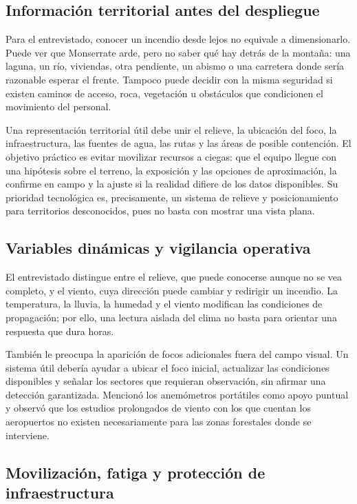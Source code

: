 \subsection{Información territorial antes del despliegue}

Para el entrevistado, conocer un incendio desde lejos no equivale a dimensionarlo. Puede ver que Monserrate arde, pero no saber qué hay detrás de la montaña: una laguna, un río, viviendas, otra pendiente, un abismo o una carretera donde sería razonable esperar el frente. Tampoco puede decidir con la misma seguridad si existen caminos de acceso, roca, vegetación u obstáculos que condicionen el movimiento del personal.

Una representación territorial útil debe unir el relieve, la ubicación del foco, la infraestructura, las fuentes de agua, las rutas y las áreas de posible contención. El objetivo práctico es evitar movilizar recursos a ciegas: que el equipo llegue con una hipótesis sobre el terreno, la exposición y las opciones de aproximación, la confirme en campo y la ajuste si la realidad difiere de los datos disponibles. Su prioridad tecnológica es, precisamente, un sistema de relieve y posicionamiento para territorios desconocidos, pues no basta con mostrar una vista plana.

\subsection{Variables dinámicas y vigilancia operativa}

El entrevistado distingue entre el relieve, que puede conocerse aunque no se vea completo, y el viento, cuya dirección puede cambiar y redirigir un incendio. La temperatura, la lluvia, la humedad y el viento modifican las condiciones de propagación; por ello, una lectura aislada del clima no basta para orientar una respuesta que dura horas.

También le preocupa la aparición de focos adicionales fuera del campo visual. Un sistema útil debería ayudar a ubicar el foco inicial, actualizar las condiciones disponibles y señalar los sectores que requieran observación, sin afirmar una detección garantizada. Mencionó los anemómetros portátiles como apoyo puntual y observó que los estudios prolongados de viento con los que cuentan los aeropuertos no existen necesariamente para las zonas forestales donde se interviene.

\subsection{Movilización, fatiga y protección de infraestructura}

